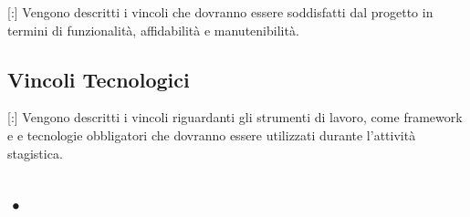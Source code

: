 \documentclass[11pt]{book}              %
\begin{document}
[:] Vengono descritti i vincoli che dovranno essere soddisfatti dal progetto in termini di funzionalità, affidabilità e manutenibilità. 

\subsection{Vincoli Tecnologici}

[:] Vengono descritti i vincoli riguardanti gli strumenti di lavoro, come framework e  e tecnologie obbligatori che dovranno essere utilizzati durante l'attività stagistica.


\subsection{•}
\end{document}
